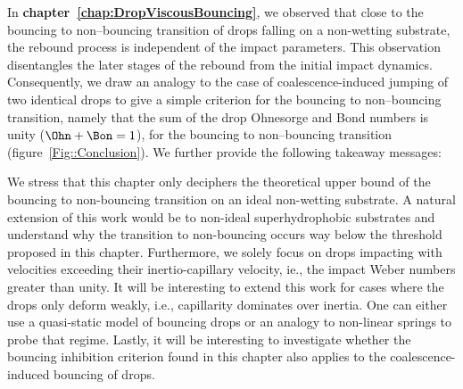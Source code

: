 In \textbf{chapter~\ref{chap:DropViscousBouncing}}, we observed that close to the bouncing to non--bouncing transition of drops falling on a non-wetting substrate, the rebound process is independent of the impact parameters. This observation disentangles the later stages of the rebound from the initial impact dynamics. Consequently, we draw an analogy to the case of coalescence-induced jumping of two identical drops \citep{boreyko2009, mouterde2017merging, lecointre2019ballistics} to give a simple criterion for the bouncing to non--bouncing transition, namely that the sum of the drop Ohnesorge and Bond numbers is unity ($\Ohn + \Bon = 1$), for the bouncing to non--bouncing transition (figure~\ref{Fig::Conclusion}). We further provide the following takeaway messages:\vspace{2mm}

\vspace{2mm}

We stress that this chapter only deciphers the theoretical upper bound of the bouncing to non-bouncing transition on an ideal non-wetting substrate. A natural extension of this work would be to non-ideal superhydrophobic substrates and understand why the transition to non-bouncing occurs way below \citep{sarma2022interfacial} the threshold proposed in this chapter. Furthermore, we solely focus on drops impacting with velocities exceeding their inertio-capillary velocity, ie., the impact Weber numbers greater than unity. It will be interesting to extend this work for cases where the drops only deform weakly, i.e., capillarity dominates over inertia. One can either use a quasi-static model of bouncing drops \citep{molavcek2012quasi} or an analogy to non-linear springs \citep{chevy2012liquid} to probe that regime. Lastly, it will be interesting to investigate whether the bouncing inhibition criterion found in this chapter also applies to the coalescence-induced bouncing of drops.\\



